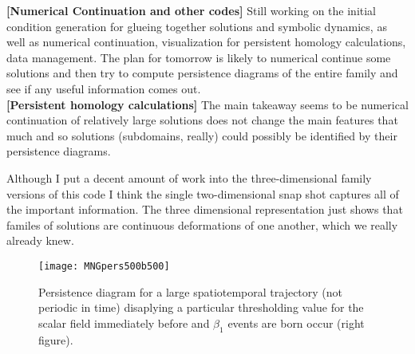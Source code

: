 \begin{description}
{{\bf [Numerical Continuation and other codes]}
Still working on the initial condition generation for glueing together solutions
and symbolic dynamics, as well as numerical continuation, visualization for
persistent homology calculations, data management. The plan for tomorrow is
likely to numerical continue some solutions and then try to compute persistence
diagrams of the entire family and see if any useful information comes out.
\\

{\bf [Persistent homology calculations]}
The main takeaway seems to be numerical continuation of relatively large
solutions does not change the main features that much and so solutions
(subdomains, really) could possibly be identified by their persistence diagrams.

Although I put a decent amount of work into the three-dimensional family
versions of this code I think the single two-dimensional snap shot captures
all of the important information. The three dimensional representation just
shows that familes of solutions are continuous deformations of one another,
which we really already knew.

}

\begin{figure}[ht]
\begin{minipage}[height=.32\textheight]{1.0\textwidth}
\centering %
\texttt{[image: MNGpers500b500]}
\end{minipage}
\caption{ \label{fig:MNGpers500b500}
Persistence diagram for a large spatiotemporal trajectory (not periodic in time)
disaplying a particular thresholding value for the scalar field immediately
before and $\beta_1$ events are born occur (right figure).
}
\end{figure}

\end{description}
